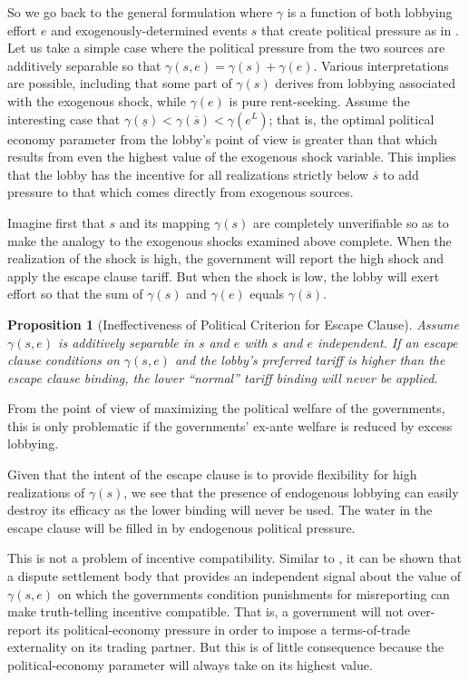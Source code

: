 \documentclass[12pt]{article}
\newtheorem{proposition}{Proposition}
\newcommand{\ov}{\overline}
\newcommand{\un}{\underline}
\newcommand{\ga}{\gamma}
\begin{document}
So we go back to the general formulation where $\ga$ is a function of both lobbying effort $e$ and exogenously-determined events $s$ that create political pressure as in \Textcite{ms2011}. Let us take a simple case where the political pressure from the two sources are additively separable so that $\ga(s,e) = \ga(s) + \ga(e)$. Various interpretations are possible, including that some part of $\ga(s)$ derives from lobbying associated with the exogenous shock, while $\ga(e)$ is pure rent-seeking. Assume the interesting case that $\ga(\un{s}) < \ga(\ov{s}) < \ga(e^L)$; that is, the optimal political economy parameter from the lobby's point of view is greater than that which results from even the highest value of the exogenous shock variable. This implies that the lobby has the incentive for all realizations strictly below $\ov{s}$ to add pressure to that which comes directly from exogenous sources.

Imagine first that $s$ and its mapping $\ga(s)$ are completely unverifiable so as to make the analogy to the exogenous shocks examined above complete. When the realization of the shock is high, the government will report the high shock and apply the escape clause tariff. But when the shock is low, the lobby will exert effort so that the sum of $\ga(s)$ and $\ga(e)$ equals $\ga(\ov{s})$.

\begin{proposition}[Ineffectiveness of Political Criterion for Escape Clause]
    Assume $\ga(s,e)$ is additively separable in $s$ and $e$ with $s$ and $e$ independent. If an escape clause conditions on $\ga(s,e)$ and the lobby's preferred tariff is higher than the escape clause binding, the lower ``normal'' tariff binding will never be applied.
\end{proposition}

From the point of view of maximizing the political welfare of the governments, this is only problematic if the governments' ex-ante welfare is reduced by excess lobbying.

Given that the intent of the escape clause is to provide flexibility for high realizations of $\ga(s)$, we see that the presence of endogenous lobbying can easily destroy its efficacy as the lower binding will never be used. The water in the escape clause will be filled in by endogenous political pressure.

This is not a problem of incentive compatibility. Similar to \Textcite{beshkar2010b}, it can be shown that a dispute settlement body that provides an independent signal about the value of $\ga(s,e)$ on which the governments condition punishments for misreporting can make truth-telling incentive compatible. That is, a government will not over-report its political-economy pressure in order to impose a terms-of-trade externality on its trading partner. But this is of little consequence because the political-economy parameter will always take on its highest value.
\end{document}
